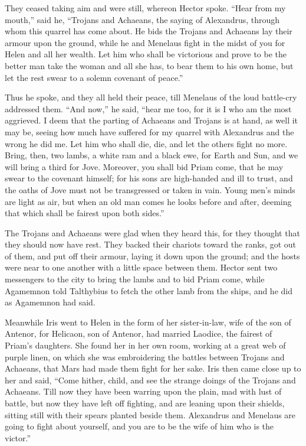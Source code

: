 They ceased taking aim and were still, whereon Hector spoke. “Hear from my
mouth,” said he, “Trojans and Achaeans, the saying of Alexandrus, through
whom this quarrel has come about. He bids the Trojans and Achaeans lay
their armour upon the ground, while he and Menelaus fight in the midst of
you for Helen and all her wealth. Let him who shall be victorious and
prove to be the better man take the woman and all she has, to bear them to
his own home, but let the rest swear to a solemn covenant of peace.”

Thus he spoke, and they all held their peace, till Menelaus of the loud
battle-cry addressed them. “And now,” he said, “hear me too, for it is I
who am the most aggrieved. I deem that the parting of Achaeans and Trojans
is at hand, as well it may be, seeing how much have suffered for my
quarrel with Alexandrus and the wrong he did me. Let him who shall die,
die, and let the others fight no more. Bring, then, two lambs, a white ram
and a black ewe, for Earth and Sun, and we will bring a third for Jove.
Moreover, you shall bid Priam come, that he may swear to the covenant
himself; for his sons are high-handed and ill to trust, and the oaths of
Jove must not be transgressed or taken in vain. Young men’s minds are
light as air, but when an old man comes he looks before and after, deeming
that which shall be fairest upon both sides.”

The Trojans and Achaeans were glad when they heard this, for they thought
that they should now have rest. They backed their chariots toward the
ranks, got out of them, and put off their armour, laying it down upon the
ground; and the hosts were near to one another with a little space between
them. Hector sent two messengers to the city to bring the lambs and to bid
Priam come, while Agamemnon told Talthybius to fetch the other lamb from
the ships, and he did as Agamemnon had said.

Meanwhile Iris went to Helen in the form of her sister-in-law, wife of the
son of Antenor, for Helicaon, son of Antenor, had married Laodice, the
fairest of Priam’s daughters. She found her in her own room, working at a
great web of purple linen, on which she was embroidering the battles
between Trojans and Achaeans, that Mars had made them fight for her sake.
Iris then came close up to her and said, “Come hither, child, and see the
strange doings of the Trojans and Achaeans. Till now they have been
warring upon the plain, mad with lust of battle, but now they have left
off fighting, and are leaning upon their shields, sitting still with their
spears planted beside them. Alexandrus and Menelaus are going to fight
about yourself, and you are to be the wife of him who is the victor.”

